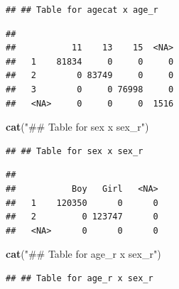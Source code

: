 \documentclass[
]{article}
\newenvironment{Shaded}{\begin{snugshade}}{\end{snugshade}}
\newcommand{\AttributeTok}[1]{\textcolor[rgb]{0.13,0.29,0.53}{#1}}
\newcommand{\FunctionTok}[1]{\textcolor[rgb]{0.13,0.29,0.53}{\textbf{#1}}}
\newcommand{\NormalTok}[1]{#1}
\newcommand{\SpecialCharTok}[1]{\textcolor[rgb]{0.81,0.36,0.00}{\textbf{#1}}}
\newcommand{\StringTok}[1]{\textcolor[rgb]{0.31,0.60,0.02}{#1}}
\begin{document}
\begin{verbatim}
## ## Table for agecat x age_r
\end{verbatim}

\begin{Shaded}
\end{Shaded}

\begin{verbatim}
##       
##           11    13    15  <NA>
##   1    81834     0     0     0
##   2        0 83749     0     0
##   3        0     0 76998     0
##   <NA>     0     0     0  1516
\end{verbatim}

\begin{Shaded}
\begin{Highlighting}[]
\FunctionTok{cat}\NormalTok{(}\StringTok{"\#\# Table for sex x sex\_r"}\NormalTok{)}
\end{Highlighting}
\end{Shaded}

\begin{verbatim}
## ## Table for sex x sex_r
\end{verbatim}

\begin{Shaded}
\end{Shaded}

\begin{verbatim}
##       
##           Boy   Girl   <NA>
##   1    120350      0      0
##   2         0 123747      0
##   <NA>      0      0      0
\end{verbatim}

\begin{Shaded}
\begin{Highlighting}[]
\FunctionTok{cat}\NormalTok{(}\StringTok{"\#\# Table for age\_r x sex\_r"}\NormalTok{)}
\end{Highlighting}
\end{Shaded}

\begin{verbatim}
## ## Table for age_r x sex_r
\end{verbatim}
\end{document}
